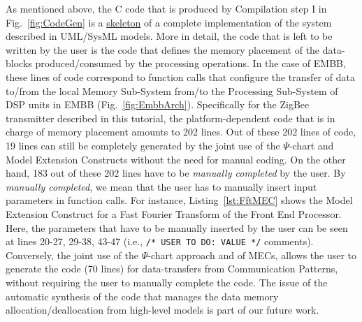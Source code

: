 \documentclass{llncs}
\begin{document}
\noindent
As mentioned above, the C code that is produced by Compilation step I in Fig.~\ref{fig:CodeGen} is a
\underline{skeleton} of a complete implementation of the system described in UML/SysML models. More in detail, the
code that is left to be written by the user is the code that defines the memory placement of the data-blocks
produced/consumed by the processing operations. In the case of EMBB, these lines of code correspond to function calls
that configure the transfer of data to/from the local Memory Sub-System from/to the Processing Sub-System of DSP units
in EMBB (Fig.~\ref{fig:EmbbArch}). Specifically for the ZigBee transmitter described in this tutorial, the
platform-dependent code that is in charge of memory placement amounts to 202 lines. Out of these 202 lines of code, 19
lines can still be completely generated by the joint use of the $\Psi$-chart and Model Extension Constructs without the
need for manual coding. On the other hand, 183 out of these 202 lines have to be \textit{manually completed} by the user. By
\textit{manually completed}, we mean that the user has to manually insert input parameters in function calls. For
instance, Listing~\ref{lst:FftMEC} shows the Model Extension Construct for a Fast Fourier Transform of the Front End
Processor. Here, the parameters that have to be manually inserted by the user can be seen at lines 20-27, 29-38, 43-47
(i.e., \texttt{/* USER TO DO: VALUE */} comments).\\
%
Conversely, the joint use of the $\Psi$-chart approach and of MECs, allows the user to generate the code (70 lines) for
data-transfers from Communication Patterns, without requiring the user to manually complete the code. The issue of the
automatic synthesis of the code that manages the data memory allocation/deallocation from high-level models is part of
our future work.\\
%
%
\end{document}
